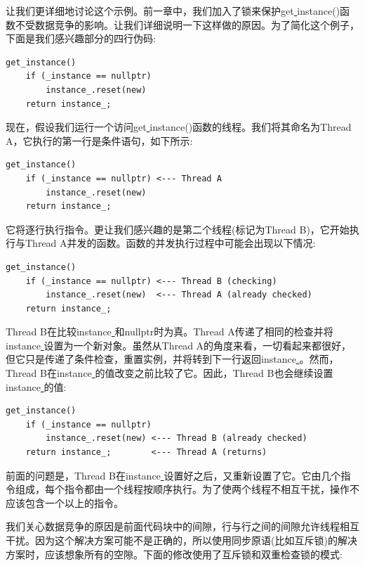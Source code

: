 让我们更详细地讨论这个示例。前一章中，我们加入了锁来保护get\underline{ }instance()函数不受数据竞争的影响。让我们详细说明一下这样做的原因。为了简化这个例子，下面是我们感兴趣部分的四行伪码: \par

\begin{lstlisting}[caption={}]
get_instance()
	if (_instance == nullptr)
		instance_.reset(new)
	return instance_;
\end{lstlisting}

现在，假设我们运行一个访问get\underline{ }instance()函数的线程。我们将其命名为Thread A，它执行的第一行是条件语句，如下所示: \par

\begin{lstlisting}[caption={}]
get_instance()
	if (_instance == nullptr) <--- Thread A
		instance_.reset(new)
	return instance_;
\end{lstlisting}

它将逐行执行指令。更让我们感兴趣的是第二个线程(标记为Thread B)，它开始执行与Thread A并发的函数。函数的并发执行过程中可能会出现以下情况: \par

\begin{lstlisting}[caption={}]
get_instance()
	if (_instance == nullptr) <--- Thread B (checking)
		instance_.reset(new)  <--- Thread A (already checked)
	return instance_;
\end{lstlisting}

Thread B在比较instance\underline{ }和nullptr时为真。Thread A传递了相同的检查并将instance\underline{ }设置为一个新对象。虽然从Thread A的角度来看，一切看起来都很好，但它只是传递了条件检查，重置实例，并将转到下一行返回instance\underline{ }。然而，Thread B在instance\underline{ }的值改变之前比较了它。因此，Thread B也会继续设置instance\underline{ }的值: \par

\begin{lstlisting}[caption={}]
get_instance()
	if (_instance == nullptr)
		instance_.reset(new) <--- Thread B (already checked)
	return instance_; 		 <--- Thread A (returns)
\end{lstlisting}

前面的问题是，Thread B在instance\underline{ }设置好之后，又重新设置了它。它由几个指令组成，每个指令都由一个线程按顺序执行。为了使两个线程不相互干扰，操作不应该包含一个以上的指令。 \par
我们关心数据竞争的原因是前面代码块中的间隙，行与行之间的间隙允许线程相互干扰。因为这个解决方案可能不是正确的，所以使用同步原语(比如互斥锁)的解决方案时，应该想象所有的空隙。下面的修改使用了互斥锁和双重检查锁的模式: \par

